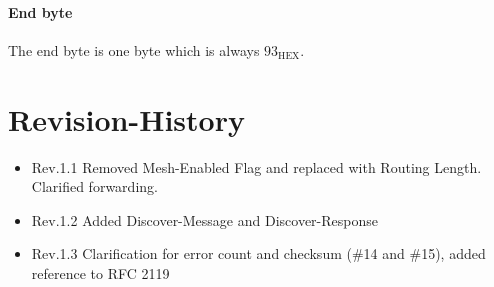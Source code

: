\documentclass{scrreprt}
\begin{document}
\subsubsection{End byte}
The end byte is one byte which is always $93_\text{HEX}$.

\pagebreak
\chapter{Revision-History}
\begin{itemize}
  \item Rev.1.1 Removed Mesh-Enabled Flag and replaced with Routing Length. Clarified forwarding.
  \item Rev.1.2 Added Discover-Message and Discover-Response
  \item Rev.1.3 Clarification for error count and checksum (\#14 and \#15), added reference to RFC 2119
\end{itemize}
\end{document}
